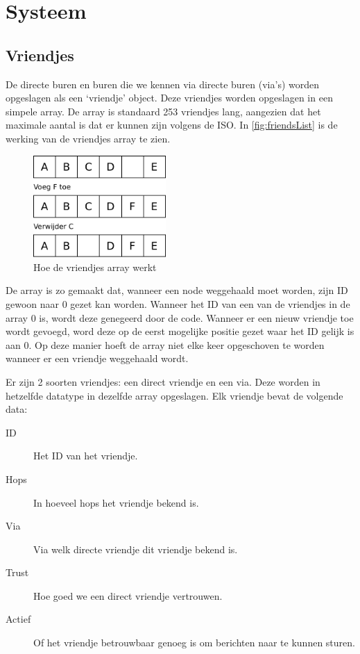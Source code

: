 \section{Systeem}



\subsection{Vriendjes}

De directe buren en buren die we kennen via directe buren (via's) worden opgeslagen als een `vriendje' object. Deze vriendjes worden opgeslagen in een simpele array. De array is standaard 253 vriendjes lang, aangezien dat het maximale aantal is dat er kunnen zijn volgens de ISO. In \autoref{fig:friendsList} is de werking van de vriendjes array te zien.


\begin{figure}[ht]
    \centering
    \includegraphics[width=0.45\textwidth]{img/friendList.pdf}
    \caption{Hoe de vriendjes array werkt}
    \label{fig:friendsList}
\end{figure}

De array is zo gemaakt dat, wanneer een node weggehaald moet worden, zijn ID gewoon naar 0 gezet kan worden. Wanneer het ID van een van de vriendjes in de array 0 is, wordt deze genegeerd door de code. Wanneer er een nieuw vriendje toe wordt gevoegd, word deze op de eerst mogelijke positie gezet waar het ID gelijk is aan 0. Op deze manier hoeft de array niet elke keer opgeschoven te worden wanneer er een vriendje weggehaald wordt.

Er zijn 2 soorten vriendjes: een direct vriendje en een via. Deze worden in hetzelfde datatype in dezelfde array opgeslagen. Elk vriendje bevat de volgende data:
\begin{description}
    \item[ID]       Het ID van het vriendje.
    \item[Hops]     In hoeveel hops het vriendje bekend is.
    \item[Via]      Via welk directe vriendje dit vriendje bekend is.
    \item[Trust]    Hoe goed we een direct vriendje vertrouwen.
    \item[Actief]   Of het vriendje betrouwbaar genoeg is om berichten naar te kunnen sturen.
\end{description}
